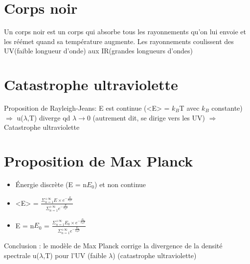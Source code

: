 \documentclass{article}
\begin{document}
\section{Corps noir}
Un corps noir est un corps qui absorbe tous les rayonnements qu'on lui envoie et les réémet quand sa température augmente.
Les rayonnements coulissent des UV(faible longueur d'onde) aux IR(grandes longueurs d'ondes)

\section{Catastrophe ultraviolette}
Proposition de Rayleigh-Jeans: E est continue (<E> = $k_{B}$T avec $k_{B}$ constante) $\Longrightarrow$ u($\lambda$,T) diverge qd $\lambda\rightarrow$0 (autrement dit, se dirige vers les UV) $\Longrightarrow$ Catastrophe ultraviolette

\section{Proposition de Max Planck}
\begin{itemize}
    \item Énergie discrète (E = n$E_{0}$) et non continue
    \item <E> = $\frac{\Sigma_{n=1}^{+\infty} E \times e^{-\frac{E}{k_{B}T}}}{\Sigma_{n=1}^{+\infty} e^{-\frac{E}{k_{B}T}}}$
    \item E = n$E_{0}$ = $\frac{\Sigma_{n=1}^{+\infty} E_{0} \times e^{-\frac{E_{0}}{k_{B}T}}}{\Sigma_{n=1}^{+\infty} e^{-\frac{E_{0}}{k_{B}T}}}$
\end{itemize}
Conclusion : le modèle de Max Planck corrige la divergence de la densité spectrale u($\lambda$,T) pour l'UV (faible $\lambda$) (catastrophe ultraviolette)
\end{document}
